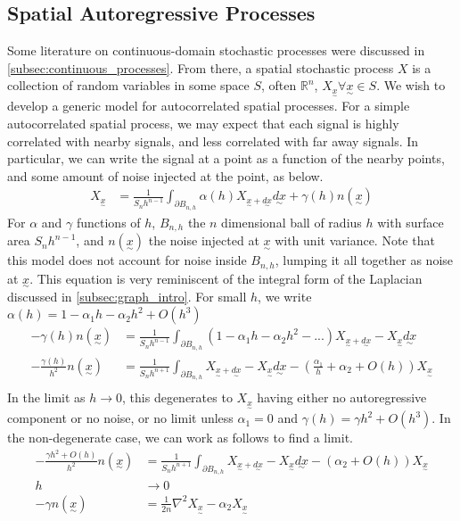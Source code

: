 \documentclass[12pt,a4paper]{article} %
\newcommand{\ve}[1]{\underset{\sim}{#1}}
\begin{document}
\subsection{Spatial Autoregressive Processes}
\label{subsec:spatial_autoreg}
Some literature on continuous-domain stochastic processes were discussed in \ref{subsec:continuous_processes}. From there, a spatial stochastic process $X$ is a collection of random variables in some space $S$, often $\mathbb{R}^n$, $X_{\ve{x}}\forall\ve{x}\in S$. We wish to develop a generic model for autocorrelated spatial processes. For a simple autocorrelated spatial process, we may expect that each signal is highly correlated with nearby signals, and less correlated with far away signals. In particular, we can write the signal at a point as a function of the nearby points, and some amount of noise injected at the point, as below.
\begin{align*}
    X_{\ve{x}}&=\frac{1}{S_nh^{n-1}}\int_{\partial B_{n,h}}\alpha(h)X_{\ve{x}+\ve{dx}}\ve{dx}+\gamma(h) n(\ve{x})
\end{align*}
For $\alpha$ and $\gamma$ functions of $h$, $B_{n,h}$ the $n$ dimensional ball of radius $h$ with surface area $S_nh^{n-1}$, and $n(\ve{x})$ the noise injected at $\ve{x}$ with unit variance. Note that this model does not account for noise inside $B_{n,h}$, lumping it all together as noise at $\ve{x}$. This equation is very reminiscent of the integral form of the Laplacian discussed in \ref{subsec:graph_intro}. For small $h$, we write $\alpha(h)=1-\alpha_1 h-\alpha_2h^2+O(h^3)$
\begin{align*}
    -\gamma(h)n(\ve{x})&=\frac{1}{S_nh^{n-1}}\int_{\partial B_{n,h}}(1-\alpha_1 h-\alpha_2h^2-...)X_{\ve{x}+\ve{dx}}-X_{\ve{x}}\ve{dx}\\
    -\frac{\gamma(h)}{h^2}n(\ve{x})&=\frac{1}{S_nh^{n+1}}\int_{\partial B_{n,h}}X_{\ve{x}+\ve{dx}}-X_{\ve{x}}\ve{dx}-(\frac{\alpha_1}{h}+\alpha_2+O(h))X_{\ve{x}}\\
\end{align*}
In the limit as $h\to0$, this degenerates to $X_{\ve{x}}$ having either no autoregressive component or no noise, or no limit unless $\alpha_1=0$ and $\gamma(h)=\gamma h^2 + O(h^3)$. In the non-degenerate case, we can work as follows to find a limit.
\begin{align*}
    -\frac{\gamma h^2 + O(h)}{h^2}n(\ve{x})&=\frac{1}{S_nh^{n+1}}\int_{\partial B_{n,h}}X_{\ve{x}+\ve{dx}}-X_{\ve{x}}\ve{dx}-(\alpha_2+O(h))X_{\ve{x}}\\
    h&\to0\\
    -\gamma n(\ve{x})&=\frac{1}{2n}\nabla^2X_{\ve{x}}-\alpha_2 X_{\ve{x}}
\end{align*}
\end{document}
